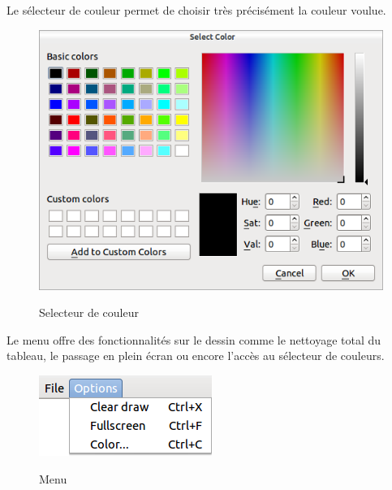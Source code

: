 \documentclass{report}
\begin{document}
				\newpage
				Le sélecteur de couleur permet de choisir très précisément la couleur voulue. \\
				\begin{figure}[!h]
						\centering
						\includegraphics[scale=0.4]{../images/colorpicker.png}\\
						\caption{Selecteur de couleur}
						\label{Selecteur de couleur}
				\end{figure}
				
				Le menu offre des fonctionnalités sur le dessin comme le nettoyage total du tableau, le passage en plein écran ou encore l'accès au sélecteur de couleurs. \\
				\begin{figure}[!h]
						\centering
						\includegraphics[scale=0.4]{../images/menu.png}\\
						\caption{Menu}
						\label{Menu}
				\end{figure}
				
\end{document}
